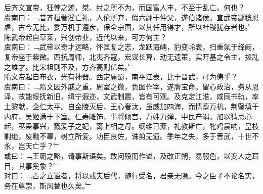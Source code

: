 后齐文宣帝，狂悖之迹，桀、纣之所不为，而国富人丰，不至于乱亡。何也？\\
虞南曰：﹁昔齐桓奢淫亡礼，人伦所弃，假六翮于仲父，遂伯诸侯。宣武帝鄙稔忍虐，古今无比，委万机于遵彦，保全宗国，以其任用得才，所以社稷犹存者也。﹂
\\
陈武帝起自草莱，兴创帝业，近代以来，可方何主？\\
虞南曰：﹁武帝以奇才远略，怀匡复之志，龙跃海嵎，豹变岭表，扫重氛于绛阙，复帝座于紫微。西抗周师，北夷齐寇，宏谋长算，动无遗策，实开基之令主，拨乱之雄才。比宋祖则不及，方齐高则优矣。﹂\\
隋文帝起自布衣，光有神器。西定庸蜀，南平江表，比于晋武，可为俦乎？\\
虞南曰：﹁隋文因外戚之重，周室之微，负图作宰，遂膺宝命。留心政治，务从恩泽，故能绥抚新旧，缉宁遐迩，文武制置，皆有可观。及克定江淮，咸同书轨，率土黎献，企伫太平。自金陵灭后，王心奢汰，虽威加四海，而情堕万机，荆璧填于内府，吴姬满于下室。仁寿雕饰，事将倾宫，万姓力殚，中民产竭。加以猜忌心起，巫蛊事兴，戮爱子之妃，离上相之母。纲维已紊，礼教斯亡，牝鸡晨响，皇枝剿绝，废黜不辜，树立所爱。功臣良佐，诛剪无遗。季年之失，多于晋武，十世不永，岂天亡乎？﹂
\\
或曰：﹁王霸之略，请事斯语矣。敢问殁而作谥，及改正朔，易服色，以变人之耳目，其事奚象？﹂\\
对曰：﹁古之立谥者，将以戒夫后代，随行受名，君亲无隐。今之臣子不论名实，务在尊崇，斯风替也久矣。﹂\\
